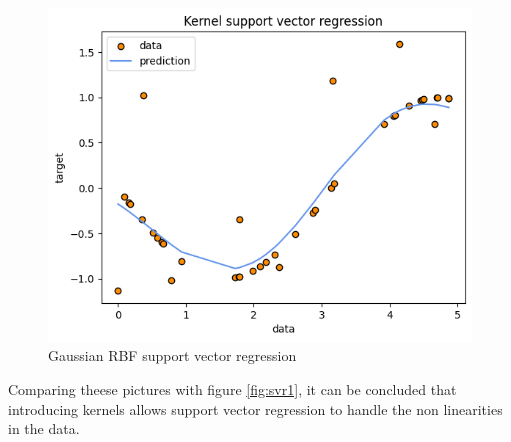 \begin{figure}
    \includegraphics[width=\textwidth]{images/svr3.png}
    \caption{Gaussian RBF support vector regression}
    \label{fig:svr3}
\end{figure}
Comparing theese pictures with figure \ref{fig:svr1}, it can be concluded that introducing kernels allows support vector regression to handle the non linearities in the data.
